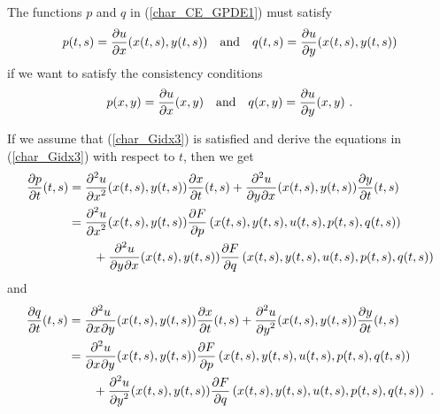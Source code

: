 The functions $p$ and $q$ in (\ref{char_CE_GPDE1}) must satisfy
\begin{equation} \label{char_Gidx3}
p(t,s) = \pdydx{u}{x}(x(t,s),y(t,s)) \quad \text{and} \quad
q(t,s) = \pdydx{u}{y}(x(t,s),y(t,s))
\end{equation}
if we want to satisfy the consistency conditions
\[
p(x,y) = \pdydx{u}{x}(x,y) \quad \text{and} \quad q(x,y) = \pdydx{u}{y}(x,y) \ .
\]

If we assume that (\ref{char_Gidx3}) is satisfied and derive the
equations in (\ref{char_Gidx3}) with respect to $t$, then we get
\begin{align}
\pdydx{p}{t}(t,s) &= \pdydxn{u}{x}{2}(x(t,s),y(t,s)) \pdydx{x}{t}(t,s)
+ \pdydxnm{u}{y}{x}{2}{}{}(x(t,s),y(t,s)) \pdydx{y}{t}(t,s) \nonumber \\
&= \pdydxn{u}{x}{2}(x(t,s),y(t,s))
\pdydx{F}{p}\left(x(t,s),y(t,s),u(t,s),p(t,s),q(t,s)\right) \nonumber \\
& \qquad + \pdydxnm{u}{y}{x}{2}{}{}(x(t,s),y(t,s))
\pdydx{F}{q}\left(x(t,s),y(t,s),u(t,s),p(t,s),q(t,s)\right)
\label{char_Gidx1}
\end{align}
and
\begin{align}
\pdydx{q}{t}(t,s) &= \pdydxnm{u}{x}{y}{2}{}{}(x(t,s),y(t,s)) \pdydx{x}{t}(t,s)
+ \pdydxn{u}{y}{2}(x(t,s),y(t,s)) \pdydx{y}{t}(t,s) \nonumber \\
&= \pdydxnm{u}{x}{y}{2}{}{}(x(t,s),y(t,s))
\pdydx{F}{p}\left(x(t,s),y(t,s),u(t,s),p(t,s),q(t,s)\right) \nonumber \\
& \qquad + \pdydxn{u}{y}{2}(x(t,s),y(t,s))
\pdydx{F}{q}\left(x(t,s),y(t,s),u(t,s),p(t,s),q(t,s)\right) \ .
\label{char_Gidx2}
\end{align}

